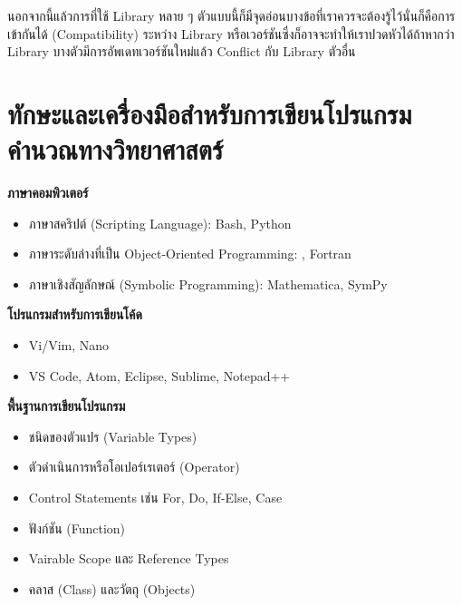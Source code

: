 นอกจากนี้แล้วการที่ใช้ Library หลาย ๆ ตัวแบบนี้ก็มีจุดอ่อนบางข้อที่เราควรจะต้องรู้ไว้นั่นก็คือการเข้ากันได้ (Compatibility) ระหว่าง Library หรือเวอร์ชันซึ่งก็อาจจะทำให้เราปวดหัวได้ถ้าหากว่า Library บางตัวมีการอัพเดทเวอร์ชันใหม่แล้ว Conflict กับ Library ตัวอื่น

\section{ทักษะและเครื่องมือสำหรับการเขียนโปรแกรมคำนวณทางวิทยาศาสตร์}

\noindent \textbf{ภาษาคอมพิวเตอร์}
%
\begin{itemize}[topsep=0pt,noitemsep]
  \setlength\itemsep{0.5em}
  \item ภาษาสคริปต์ (Scripting Language): Bash, Python

  \item ภาษาระดับล่างที่เป็น Object-Oriented Programming: \cpp, Fortran

  \item ภาษาเชิงสัญลักษณ์ (Symbolic Programming): Mathematica, SymPy
\end{itemize}

\noindent \textbf{โปรแกรมสำหรับการเขียนโค้ด}
%
\begin{itemize}[topsep=0pt,noitemsep]
  \setlength\itemsep{0.5em}
  \item Vi/Vim, Nano

  \item VS Code, Atom, Eclipse, Sublime, Notepad++
\end{itemize}

\noindent \textbf{พื้นฐานการเขียนโปรแกรม}
%
\begin{itemize}[topsep=0pt,noitemsep]
  \setlength\itemsep{0.5em}
  \item ชนิดของตัวแปร (Variable Types)

  \item ตัวดำเนินการหรือโอเปอร์เรเตอร์ (Operator)

  \item Control Statements เช่น For, Do, If-Else, Case

  \item ฟังก์ชัน (Function)

  \item Vairable Scope และ Reference Types

  \item คลาส (Class) และวัตถุ (Objects)
\end{itemize}

